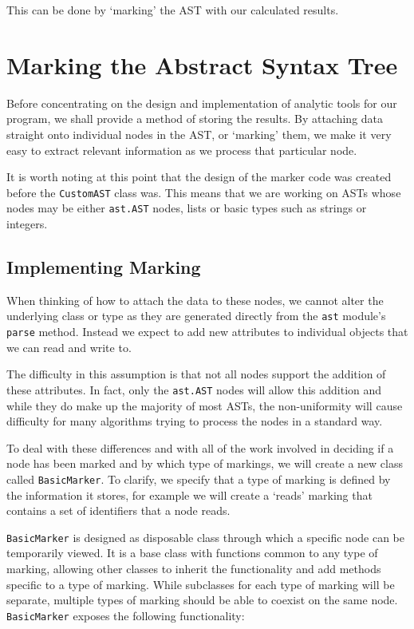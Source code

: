 \documentclass[twoside,a4paper]{report}
\begin{document}
This can be done by `marking' the AST with our calculated results.

\section{Marking the Abstract Syntax Tree}

Before concentrating on the design and implementation of analytic tools for our program, we shall provide a method of storing
the results. By attaching data straight onto individual nodes in the AST, or `marking' them, we make it very easy to extract
relevant information as we process that particular node.

It is worth noting at this point that the design of the marker code was created before the \texttt{CustomAST} class was. This
means that we are working on ASTs whose nodes may be either \texttt{ast.AST} nodes, lists or basic types such as strings or
integers.

\subsection{Implementing Marking}

When thinking of how to attach the data to these nodes, we cannot alter the underlying class or type as they are generated directly
from the \texttt{ast} module's \texttt{parse} method. Instead we expect to add new attributes to individual objects that we can read
and write to.

The difficulty in this assumption is that not all nodes support the addition of these attributes. In fact, only the \texttt{ast.AST} nodes will allow this
addition and while they do make up the majority of most ASTs, the non-uniformity will cause difficulty for many algorithms trying to process the
nodes in a standard way.

To deal with these differences and with all of the work involved in deciding if a node has been marked and by which type of markings,
we will create a new class called \texttt{BasicMarker}. To clarify, we specify that a type of marking is defined by the information it stores, for example
we will create a `reads' marking that contains a set of identifiers that a node reads.


\texttt{BasicMarker} is designed as disposable class through which a specific node can be temporarily viewed. It is a base
class with functions common to any type of marking, allowing other classes to inherit the functionality and add methods specific to a
type of marking. While subclasses for each type of marking will be separate, multiple types of marking should be able to coexist on the
same node. \texttt{BasicMarker} exposes the following functionality:
\end{document}
